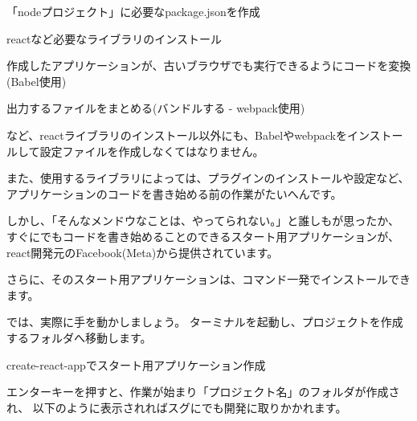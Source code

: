 \begin{starteritemize}
\item 「nodeプロジェクト」に必要なpackage.jsonを作成
\item reactなど必要なライブラリのインストール
\item 作成したアプリケーションが、古いブラウザでも実行できるようにコードを変換(Babel使用)
\item 出力するファイルをまとめる(バンドルする {-} webpack使用)
\end{starteritemize}

など、reactライブラリのインストール以外にも、Babelやwebpackをインストールして設定ファイルを作成しなくてはなりません。

\vspace*{\baselineskip}

また、使用するライブラリによっては、プラグインのインストールや設定など、アプリケーションのコードを書き始める前の作業がたいへんです。

\vspace*{\baselineskip}

しかし、「そんなメンドウなことは、やってられない。」と誰しもが思ったか、
すぐにでもコードを書き始めることのできるスタート用アプリケーションが、react開発元のFacebook(Meta)から提供されています。

\vspace*{\baselineskip}

さらに、そのスタート用アプリケーションは、コマンド一発でインストールできます。

\vspace*{\baselineskip}

では、実際に手を動かしましょう。
ターミナルを起動し、プロジェクトを作成するフォルダへ移動します。

\def\startercodeblockfontsize{}
\begin{starterterminal}[]{create{-}react{-}appでスタート用アプリケーション作成}\end{starterterminal}

エンターキーを押すと、作業が始まり「プロジェクト名」のフォルダが作成され、
以下のように表示されればスグにでも開発に取りかかれます。

